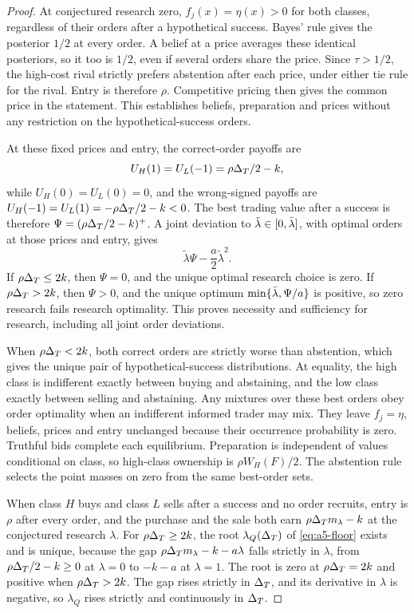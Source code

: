 \begin{proof}
At conjectured research zero, \(f_j(x)=\eta(x)>0\) for both classes, regardless of their orders after a
hypothetical success. Bayes' rule gives the posterior \(1/2\) at every order. A belief at a price averages these identical posteriors,
so it too is \(1/2\), even if several orders share the price. Since \(\tau>1/2\), the high-cost rival
strictly prefers abstention after each price, under either tie rule for the rival. Entry is therefore \(\rho\).
Competitive pricing then gives the common price in the statement. This establishes beliefs, preparation and
prices without any restriction on the hypothetical-success orders.

At these fixed prices and entry, the correct-order payoffs are
\[
 U_H(1)=U_L(-1)=\rho\Delta_T/2-k,
\]
while \(U_H(0)=U_L(0)=0\), and the wrong-signed payoffs are
\(U_H(-1)=U_L(1)=-\rho\Delta_T/2-k<0\). The best trading value after a success is therefore
\(\Psi=(\rho\Delta_T/2-k)^+\). A joint deviation to \(\tilde\lambda\in[0,\bar\lambda]\), with optimal orders at those
prices and entry, gives
\[
 \tilde\lambda\Psi-\frac a2\tilde\lambda^2.
\]
If \(\rho\Delta_T\le2k\), then \(\Psi=0\), and the unique optimal research choice is zero. If \(\rho\Delta_T>2k\),
then \(\Psi>0\), and the unique optimum \(\min\{\bar\lambda,\Psi/a\}\) is positive, so zero research fails research
optimality. This proves necessity and sufficiency for research, including all joint order deviations.

When \(\rho\Delta_T<2k\), both correct orders are strictly worse than abstention, which gives the unique pair of
hypothetical-success distributions. At equality, the high class is indifferent exactly between buying and
abstaining, and the low class exactly between selling and abstaining. Any mixtures over these best orders obey
order optimality when an indifferent informed trader may mix. They leave \(f_j=\eta\), beliefs, prices and entry
unchanged because their occurrence probability is zero. Truthful bids complete each equilibrium. Preparation
is independent of values conditional on class, so high-class ownership is \(\rho W_H(F)/2\). The abstention
rule selects the point masses on zero from the same best-order sets.


When class \(H\) buys and class \(L\) sells after a success and no order recruits, entry is \(\rho\) after every
order, and the purchase and the sale both earn \(\rho\Delta_T m_\lambda-k\) at the conjectured research \(\lambda\). For
\(\rho\Delta_T\ge2k\), the root \(\lambda_Q(\Delta_T)\) of \eqref{eq:a5-floor} exists and is unique, because
the gap \(\rho\Delta_T m_\lambda-k-a\lambda\) falls strictly in \(\lambda\), from
\(\rho\Delta_T/2-k\ge0\) at \(\lambda=0\) to \(-k-a\) at \(\lambda=1\). The root is zero at
\(\rho\Delta_T=2k\) and positive when \(\rho\Delta_T>2k\). The gap rises
strictly in \(\Delta_T\), and its derivative in \(\lambda\) is negative, so \(\lambda_Q\) rises strictly and continuously
in \(\Delta_T\).


\end{proof}
